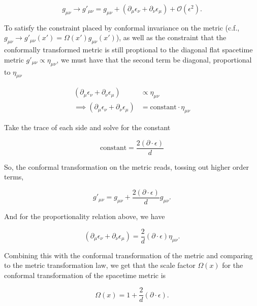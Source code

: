 \documentclass[10pt]{article}
\begin{document}
\begin{equation}
g_{\mu\nu} \rightarrow g'_{\mu\nu} = g_{\mu\nu} + (\partial_\mu \epsilon_\nu + \partial_\nu \epsilon_\mu) + \mathcal{O} (\epsilon^2).
\end{equation}

\noindent To satisfy the constraint placed by conformal invariance on the metric (c.f., $g_{\mu\nu} \rightarrow g'_{\mu\nu} (x') = \Omega(x') g_{\mu\nu} (x')$), as well as the constraint that the conformally transformed metric is still proptional to the diagonal flat spacetime metric $g'_{\mu\nu} \propto \eta_{\mu\nu}$, we must have that the second term be diagonal, proportional to $\eta_{\mu\nu}$

\begin{align}
(\partial_\mu \epsilon_\nu + \partial_\nu \epsilon_\mu) &\propto \eta_{\mu\nu} \\
\implies (\partial_\mu \epsilon_\nu + \partial_\nu \epsilon_\mu) &= \text{constant} \cdot \eta_{\mu\nu}
\end{align}

\noindent Take the trace of each side and solve for the constant

\begin{equation}
\text{constant} = \frac{2 (\partial \cdot \epsilon)}{d}
\end{equation}

\noindent So, the conformal transformation on the metric reads, tossing out higher order terms,

\begin{equation}
g'_{\mu\nu} = g_{\mu\nu} + \frac{2 (\partial \cdot \epsilon)}{d} g_{\mu\nu}.
\end{equation}

\noindent And for the proportionality relation above, we have

\begin{equation}
(\partial_\mu \epsilon_\nu + \partial_\nu \epsilon_\mu) = \frac{2}{d} (\partial \cdot \epsilon) \eta_{\mu\nu}.
\end{equation}

\noindent Combining this with the conformal transformation of the metric and comparing to the metric transformation law, we get that the scale factor $\Omega(x)$ for the conformal transformation of the spacetime metric is 

\begin{equation}
\Omega(x) = 1+\frac{2}{d} (\partial \cdot \epsilon).
\end{equation}
\end{document}
